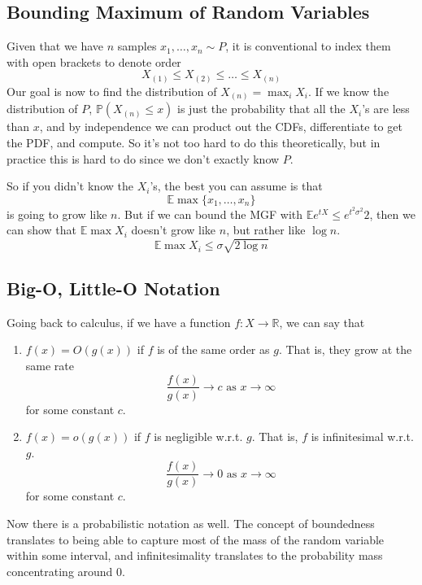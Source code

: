   \subsection{Bounding Maximum of Random Variables}

  Given that we have $n$ samples $x_1, \ldots, x_n \sim P$, it is conventional to index them with open brackets to denote order 
  \[X_{(1)} \leq X_{(2)} \leq \ldots \leq X_{(n)}\]
  Our goal is now to find the distribution of $X_{(n)} = \max_i X_i$. If we know the distribution of $P$, $\mathbb{P}(X_{(n)} \leq x)$ is just the probability that all the $X_i$'s are less than $x$, and by independence we can product out the CDFs, differentiate to get the PDF, and compute. So it's not too hard to do this theoretically, but in practice this is hard to do since we don't exactly know $P$. 

  So if you didn't know the $X_i$'s, the best you can assume is that 
  \[\mathbb{E} \max\{x_1, \ldots, x_n\}\]
  is going to grow like $n$. But if we can bound the MGF with $\mathbb{E} e^{t X} \leq e^{t^2 \sigma^2}{2}$, then we can show that $\mathbb{E} \max X_i$ doesn't grow like $n$, but rather like $\log{n}$. 
  \[\mathbb{E} \max{X_i} \leq \sigma \sqrt{2 \log{n}}\]

  \subsection{Big-O, Little-O Notation}

  Going back to calculus, if we have a function $f: X \longrightarrow \mathbb{R}$, we can say that 
  \begin{enumerate}
      \item $f(x) = O(g(x))$ if $f$ is of the same order as $g$. That is, they grow at the same rate 
      \[\frac{f(x)}{g(x)} \rightarrow c \text{ as } x \rightarrow \infty\]
      for some constant $c$. 
      \item $f(x) = o(g(x))$ if $f$ is negligible w.r.t. $g$. That is, $f$ is infinitesimal w.r.t. $g$. 
      \[\frac{f(x)}{g(x)} \rightarrow 0 \text{ as } x \rightarrow \infty\]
      for some constant $c$. 
  \end{enumerate}
  Now there is a probabilistic notation as well. The concept of boundedness translates to being able to capture most of the mass of the random variable within some interval, and infinitesimality translates to the probability mass concentrating around $0$. 

